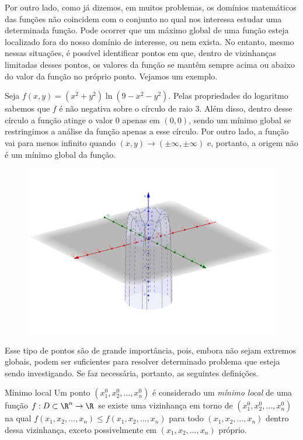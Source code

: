 Por outro lado, como já dizemos, em muitos problemas, os domínios matemáticos das funções não coincidem com o conjunto no qual nos interessa estudar uma determinada função. Pode ocorrer que um máximo global de uma função esteja localizado fora do nosso domínio de interesse, ou nem exista. No entanto, mesmo nessas situações, é possível identificar pontos em que, dentro de vizinhanças limitadas desses pontos, os valores da função se mantêm sempre acima ou abaixo do valor da função no próprio ponto. Vejamos um exemplo.
\begin{example}{}{}
Seja $f(x,y)=(x^2+y^2)\ln(9-x^2-y^2)$. Pelas propriedades do logaritmo sabemos que $f$ é não negativa sobre o círculo de raio 3. Além disso, dentro desse círculo a função atinge o valor $0$ apenas em $(0,0)$, sendo um mínimo global se restringimos a análise da função apenas a esse círculo. Por outro lado, a função vai para menos infinito quando $(x,y)\rightarrow (\pm \infty,\pm \infty)$ e, portanto, a origem não é um mínimo global da função. 
\begin{figure}[H]
    \centering
    \includegraphics[width=\linewidth]{Figuras/Semana11/log_.png}
    \caption{}
    \label{fig:log}
\end{figure}
\end{example}

\pagebreak 
Esse tipo de pontos são de grande importância, pois,  embora não sejam extremos globais, podem ser suficientes para resolver determinado problema que esteja sendo  investigando. Se faz necessária, portanto, as seguintes definições. 
\begin{definition}{Mínimo local}{}
Um ponto \((x_1^0, x_2^0, \ldots, x_n^0)\) é considerado um \textit{mínimo local} de uma função \(f:D\subset\R^n\to\R\) se existe uma vizinhança em torno de \((x_1^0, x_2^0, \ldots, x_n^0)\) na qual \(f(x_1, x_2, \ldots, x_n)\leq f(x_1, x_2, \ldots, x_n)\) para todo $(x_1, x_2, \ldots, x_n)$ dentro dessa vizinhança, exceto possivelmente em \((x_1, x_2, \ldots, x_n)\) próprio.     
\end{definition}


